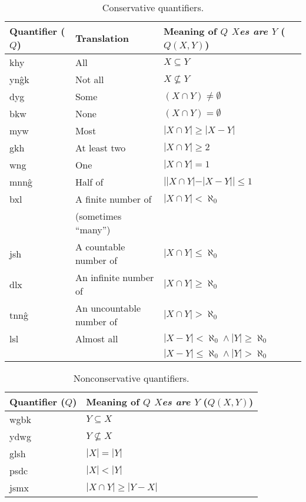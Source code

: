 \documentclass{book}
\begin{document}
\begin{table}[h]
  \caption{Conservative quantifiers.} \label{table:quantc}
  \centering
  \begin{tabu}to 
    \textnormal{Quantifier ($Q$)} & Translation & Meaning of \emph{$Q$ $X$es are $Y$} ($Q(X, Y)$) \\
    \hline
    khy & All & $X \subseteq Y$ \\
    yn\^gk & Not all & $X \not\subseteq Y$ \\
    dyg & Some & $(X \cap Y) \neq \emptyset$ \\
    bkw & None & $(X \cap Y) = \emptyset$ \\
    myw & Most & $|X \cap Y| \ge |X - Y|$ \\
    gkh & At least two & $|X \cap Y| \ge 2$ \\
    wng & One & $|X \cap Y| = 1$ \\
    mnn\^g & Half of & $| |X \cap Y| - |X - Y| | \le 1$ \\
    bxl & A finite number of & $|X \cap Y| < \aleph_0$ \\
    & (sometimes ``many'') & \\
    jsh & A countable number of & $|X \cap Y| \le \aleph_0$ \\
    dlx & An infinite number of & $|X \cap Y| \ge \aleph_0$ \\
    tnn\^g & An uncountable number of & $|X \cap Y| > \aleph_0$ \\
    lsl & Almost all & $|X - Y| < \aleph_0 \land |Y| \ge \aleph_0$ \\
    & & $|X - Y| \le \aleph_0 \land |Y| > \aleph_0$ \\
  \end{tabu}
\end{table}

\begin{table}[ht]
  \caption{Nonconservative quantifiers.} \label{table:quantnc}
  \centering
  \begin{tabu}to 
    \textnormal{Quantifier ($Q$)} & Meaning of \emph{$Q$ $X$es are $Y$} ($Q(X, Y)$) \\
    \hline
    wgbk & $Y \subseteq X$ \\
    ydwg & $Y \not\subseteq X$ \\
    glsh & $|X| = |Y|$ \\
    psdc & $|X| < |Y|$ \\
    jsmx & $|X \cap Y| \ge |Y - X|$ \\
  \end{tabu}
\end{table}
\end{document}
